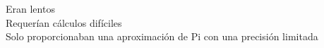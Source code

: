 \documentclass[preview]{standalone}
\begin{document}
Eran lentos\\Requerían cálculos difíciles\\Solo proporcionaban una aproximación de Pi con una precisión limitada\\
\end{document}
